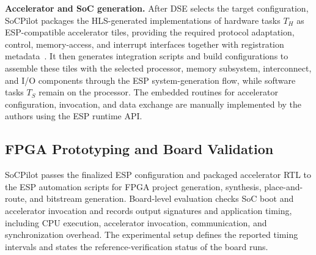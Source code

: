 \textbf{Accelerator and SoC generation.}
After DSE selects the target configuration, SoCPilot packages the HLS-generated implementations of hardware tasks $T_H$ as ESP-compatible accelerator tiles, providing the required protocol adaptation, control, memory-access, and interrupt interfaces together with registration metadata~\cite{mantovani2016hlsembedded}. It then generates integration scripts and build configurations to assemble these tiles with the selected processor, memory subsystem, interconnect, and I/O components through the ESP system-generation flow, while software tasks $T_S$ remain on the processor. The embedded routines for accelerator configuration, invocation, and data exchange are manually implemented by the authors using the ESP runtime API.
\subsection{FPGA Prototyping and Board Validation}\label{sec:soc-Prototyping}
SoCPilot passes the finalized ESP configuration and packaged accelerator RTL to the ESP automation scripts \cite{zuckerman2021cohmeleon} for FPGA project generation, synthesis, place-and-route, and bitstream generation. Board-level evaluation checks SoC boot and accelerator invocation and records output signatures and application timing, including CPU execution, accelerator invocation, communication, and synchronization overhead. The experimental setup defines the reported timing intervals and states the reference-verification status of the board runs.




